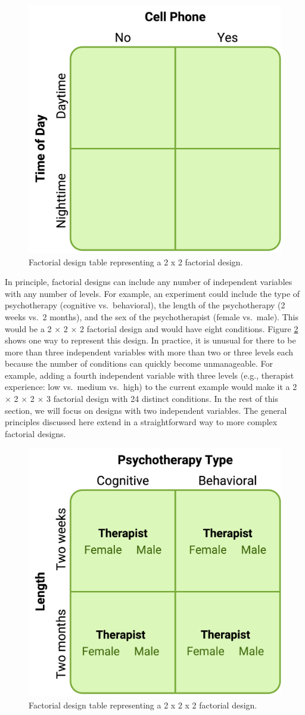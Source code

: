 \documentclass[
]{krantz}
\begin{document}
\begin{figure}

{\centering \includegraphics[width=0.5\linewidth]{images/complex-designs/designtable} 

}

\caption{Factorial design table representing a 2 x 2 factorial design.}\label{fig:designtable}
\end{figure}

In principle, factorial designs can include any number of independent variables with any number of levels. For example, an experiment could include the type of psychotherapy (cognitive vs.~behavioral), the length of the psychotherapy (2 weeks vs.~2 months), and the sex of the psychotherapist (female vs.~male). This would be a 2 × 2 × 2 factorial design and would have eight conditions. Figure \ref{fig:designtable2} shows one way to represent this design. In practice, it is unusual for there to be more than three independent variables with more than two or three levels each because the number of conditions can quickly become unmanageable. For example, adding a fourth independent variable with three levels (e.g., therapist experience: low vs.~medium vs.~high) to the current example would make it a 2 × 2 × 2 × 3 factorial design with 24 distinct conditions. In the rest of this section, we will focus on designs with two independent variables. The general principles discussed here extend in a straightforward way to more complex factorial designs.

\begin{figure}

{\centering \includegraphics[width=0.5\linewidth]{images/complex-designs/designtable2} 

}

\caption{Factorial design table representing a 2 x 2 x 2 factorial design.}\label{fig:designtable2}
\end{figure}
\end{document}
